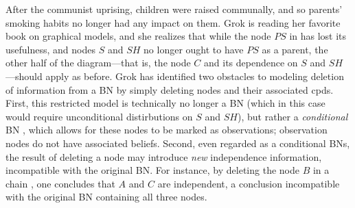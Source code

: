 \documentclass{article}
\theoremstyle{plain}
\theoremstyle{definition}
\newenvironment{example}
	{\pushQED{\qed}\renewcommand{\qedsymbol}{$\triangle$}\examplex}
	{\popQED\endexamplex%
}
\theoremstyle{remark}
\numberwithin{equation}{section}
\begin{document}
	\begin{example}[restriction]\label{ex:grok-ablate}
		After the communist uprising, children were raised communally, and so parents' smoking habits no longer had any impact on them. Grok is reading her favorite book on graphical models, and she realizes that while the node $\mathit{PS}$ in  has lost its usefulness, and nodes $S$ and $\mathit{SH}$ no longer ought to have $\mathit{PS}$ as a parent, the other half of the diagram---that is, the node $C$ and its dependence on $S$ and $\mathit{SH}$---should apply as before.
%		
		Grok has identified two obstacles to modeling deletion of information from a BN by simply deleting nodes and their associated cpds.
		First, this restricted model is technically no longer a
                BN (which in this case would require unconditional distirbutions on $S$ and $\mathit{SH}$), but rather a \emph{conditional} BN
                \cite{koller2009probabilistic}%
				, which
				allows for these
                nodes to be marked as observations; observation nodes
                do not have associated beliefs.  
		Second, even regarded as a conditional BNs, the result of deleting a node may introduce \emph{new} independence information, incompatible with the original BN.
		For instance, by deleting the node $B$ in a chain 
		\scalebox{0.6}{
		\begin{tikzcd}[dpad={light pad}, column sep = 1.3em, AmpRep]
			A \ar[r] \& B \ar[r] \& C
		\end{tikzcd}},
		one concludes that $A$ and $C$ are independent, a
               conclusion incompatible with the original BN
               containing all three nodes.   



\end{example}
\end{document}
